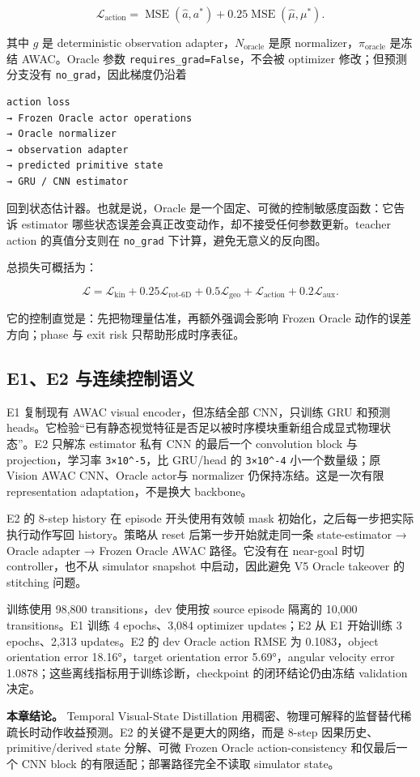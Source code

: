 \[
\mathcal L_{\text{action}}
=\operatorname{MSE}(\hat a,a^*)
+0.25\operatorname{MSE}(\hat\mu,\mu^*).
\]

其中 \(g\) 是 deterministic observation adapter，\(N_{\text{oracle}}\) 是原 normalizer，\(\pi_{\text{oracle}}\) 是冻结 AWAC。Oracle 参数 \texttt{requires\_grad=False}，不会被 optimizer 修改；但预测分支没有 \texttt{no\_grad}，因此梯度仍沿着

\begin{Verbatim}[breaklines=true,breakanywhere=true,fontsize=\small]
action loss
→ Frozen Oracle actor operations
→ Oracle normalizer
→ observation adapter
→ predicted primitive state
→ GRU / CNN estimator
\end{Verbatim}

回到状态估计器。也就是说，Oracle 是一个固定、可微的控制敏感度函数：它告诉 estimator 哪些状态误差会真正改变动作，却不接受任何参数更新。teacher action 的真值分支则在 \texttt{no\_grad} 下计算，避免无意义的反向图。

总损失可概括为：

\[
\mathcal L
=\mathcal L_{\text{kin}}
+0.25\mathcal L_{\text{rot-6D}}
+0.5\mathcal L_{\text{geo}}
+\mathcal L_{\text{action}}
+0.2\mathcal L_{\text{aux}}.
\]

它的控制直觉是：先把物理量估准，再额外强调会影响 Frozen Oracle 动作的误差方向；phase 与 exit risk 只帮助形成时序表征。

\hypertarget{e1e2-ux4e0eux8fdeux7eedux63a7ux5236ux8bedux4e49}{%
\subsection{E1、E2 与连续控制语义}\label{e1e2-ux4e0eux8fdeux7eedux63a7ux5236ux8bedux4e49}}

E1 复制现有 AWAC visual encoder，但冻结全部 CNN，只训练 GRU 和预测 heads。它检验``已有静态视觉特征是否足以被时序模块重新组合成显式物理状态''。E2 只解冻 estimator 私有 CNN 的最后一个 convolution block 与 projection，学习率 \texttt{3×10\^{}-5}，比 GRU/head 的 \texttt{3×10\^{}-4} 小一个数量级；原 Vision AWAC CNN、Oracle actor与 normalizer 仍保持冻结。这是一次有限 representation adaptation，不是换大 backbone。

E2 的 8-step history 在 episode 开头使用有效帧 mask 初始化，之后每一步把实际执行动作写回 history。策略从 reset 后第一步开始就走同一条 state-estimator → Oracle adapter → Frozen Oracle AWAC 路径。它没有在 near-goal 时切 controller，也不从 simulator snapshot 中启动，因此避免 V5 Oracle takeover 的 stitching 问题。

训练使用 98,800 transitions，dev 使用按 source episode 隔离的 10,000 transitions。E1 训练 4 epochs、3,084 optimizer updates；E2 从 E1 开始训练 3 epochs、2,313 updates。E2 的 dev Oracle action RMSE 为 0.1083，object orientation error 18.16°，target orientation error 5.69°，angular velocity error 1.0878；这些离线指标用于训练诊断，checkpoint 的闭环结论仍由冻结 validation 决定。

\textbf{本章结论。} Temporal Visual-State Distillation 用稠密、物理可解释的监督替代稀疏长时动作收益预测。E2 的关键不是更大的网络，而是 8-step 因果历史、primitive/derived state 分解、可微 Frozen Oracle action-consistency 和仅最后一个 CNN block 的有限适配；部署路径完全不读取 simulator state。

\autocite{zhou2019continuity}
